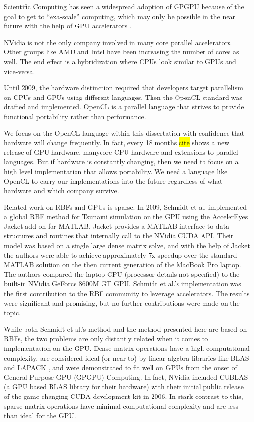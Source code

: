 \documentclass[11pt]{report}
\begin{document}
Scientific Computing has seen a widespread adoption of GPGPU because of the goal to get to ``exa-scale'' computing, which may only be possible in the near future with the help of GPU accelerators \cite{GPUandExascale2011}. 

NVidia is not the only company involved in many core parallel accelerators. Other groups like AMD and Intel have been increasing the number of cores as well. The end effect is a hybridization where CPUs look similar to GPUs and vice-versa. 

Until 2009, the hardware distinction required that developers target parallelism on CPUs and GPUs using different languages. Then the OpenCL standard was drafted and implemented. OpenCL is a parallel language that strives to provide functional portability rather than performance. 

We focus on the OpenCL language within this dissertation with confidence that hardware will change frequently. In fact, every 18 months \hl{cite} shows a new release of GPU hardware, manycore CPU hardware and extensions to parallel languages. But if hardware is constantly changing, then we need to focus on a high level implementation that allows portability. We need a language like OpenCL to carry our implementations into the future regardless of what hardware and which company survive. 


Related work on RBFs and GPUs is sparse. In 2009, Schmidt et al. \cite{Schmidt2009a, Schmidt2009b} implemented a global RBF method for Tsunami simulation on the GPU using the AccelerEyes Jacket \cite{JacketGuide2009} add-on for MATLAB. Jacket provides a MATLAB interface to data structures and routines that internally call to the NVidia CUDA API. Their model was based on a single large dense matrix solve, and with the help of Jacket the authors were able to achieve approximately 7x speedup over the standard MATLAB solution on the then current generation of the MacBook Pro laptop. The authors compared the laptop CPU (processor details not specified) to the built-in NVidia GeForce 8600M GT GPU. Schmidt et al.'s implementation was the first contribution to the RBF community to leverage accelerators. The results were significant and promising, but no further contributions were made on the topic. 

While both Schmidt et al.'s method and the method presented here are based on RBFs, the two problems are only distantly related when it comes to implementation on the GPU. Dense matrix operations have a high computational complexity, are considered ideal (or near to) by linear algebra libraries like BLAS \cite{BLAS} and LAPACK \cite{Lapack1999}, and were demonstrated to fit well on GPUs from the onset of General Purpose GPU (GPGPU) Computing. In fact, NVidia included CUBLAS \cite{CUBLAS} (a GPU based BLAS library for their hardware) with their initial public release of the game-changing CUDA development kit in 2006. In stark contrast to this, sparse matrix operations have minimal computational complexity and are less than ideal for the GPU.
\end{document}
